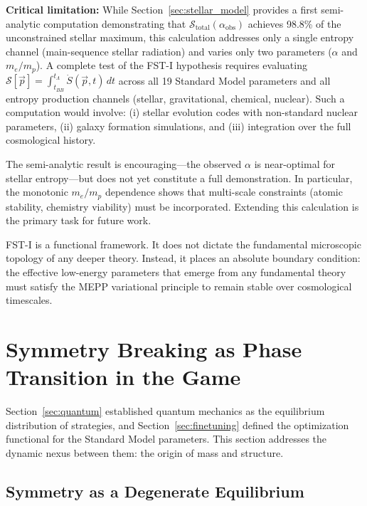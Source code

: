 \documentclass[12pt,a4paper]{article}
\theoremstyle{remark}
\begin{document}
\textbf{Critical limitation:} While Section~\ref{sec:stellar_model} provides a first semi-analytic computation demonstrating that $\mathcal{S}_{\text{total}}(\alpha_{\text{obs}})$ achieves 98.8\% of the unconstrained stellar maximum, this calculation addresses only a single entropy channel (main-sequence stellar radiation) and varies only two parameters ($\alpha$ and $m_e/m_p$). A complete test of the FST-I hypothesis requires evaluating $\mathcal{S}[\vec{p}] = \int_{t_{BB}}^{t_\Lambda} \dot{S}(\vec{p}, t)\,dt$ across all 19 Standard Model parameters and all entropy production channels (stellar, gravitational, chemical, nuclear). Such a computation would involve: (i) stellar evolution codes with non-standard nuclear parameters, (ii) galaxy formation simulations, and (iii) integration over the full cosmological history.

The semi-analytic result is encouraging---the observed $\alpha$ is near-optimal for stellar entropy---but does not yet constitute a full demonstration. In particular, the monotonic $m_e/m_p$ dependence shows that multi-scale constraints (atomic stability, chemistry viability) must be incorporated. Extending this calculation is the primary task for future work.

FST-I is a functional framework. It does not dictate the fundamental microscopic topology of any deeper theory. Instead, it places an absolute boundary condition: the effective low-energy parameters that emerge from any fundamental theory must satisfy the MEPP variational principle to remain stable over cosmological timescales.

\section{Symmetry Breaking as Phase Transition in the Game}
\label{sec:symmetry}

Section~\ref{sec:quantum} established quantum mechanics as the equilibrium distribution of strategies, and Section~\ref{sec:finetuning} defined the optimization functional for the Standard Model parameters. This section addresses the dynamic nexus between them: the origin of mass and structure.

\subsection{Symmetry as a Degenerate Equilibrium}
\end{document}
